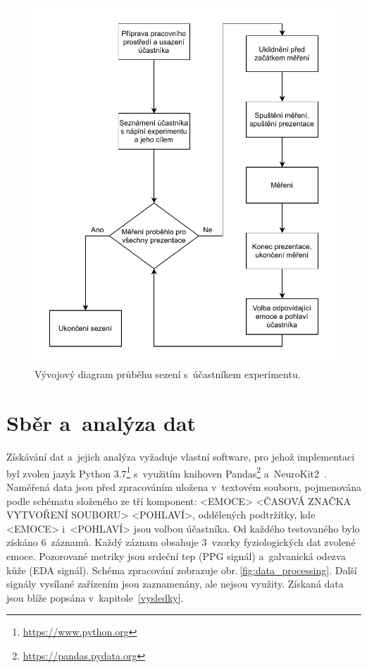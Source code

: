     \begin{figure}[H]
        \centering
        \includegraphics{obrazky-figures/session.pdf}
        \caption{Vývojový diagram průběhu sezení s~účastníkem experimentu.}
        \label{fig:session_diagram}
    \end{figure}
    
    \section{Sběr a~analýza dat}
    Získávání dat a~jejich analýza vyžaduje vlastní software, pro jehož implementaci byl zvolen jazyk Python 3.7\footnote{\url{https://www.python.org}} s~využitím knihoven Pandas\footnote{\url{https://pandas.pydata.org}} a~NeuroKit2~\cite{Makowski2021neurokit}. Naměřená data jsou před zpracováním uložena v~textovém souboru, pojmenována podle schématu složeného ze tří komponent: <EMOCE> <ČA\-SO\-VÁ ZNAČKA VYTVOŘENÍ SOUBORU> <POHLAVÍ>, oddělených podtržítky, kde <EMOCE> i~<POHLAVÍ> jsou volbou účastníka. Od každého testovaného bylo získáno 6~záznamů. Každý záznam obsahuje 3~vzorky fyziologických dat zvolené emoce. Pozorované metriky jsou srdeční tep (PPG signál) a~galvanická odezva kůže (EDA signál). Schéma zpracování zobrazuje obr.\,\ref{fig:data_processing}. Další signály vysílané zařízením jsou zaznamenány, ale nejsou využity. Získaná data jsou blíže popsána v~kapitole~\ref{vysledky}.
    
